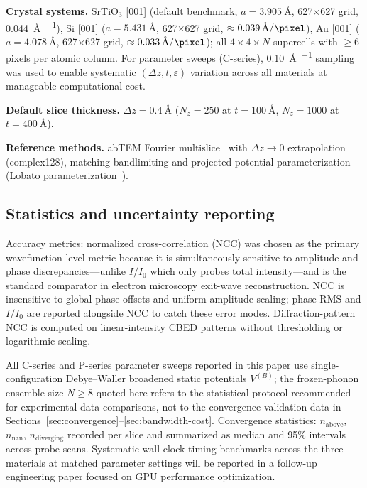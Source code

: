 \documentclass[twoside,11pt]{article}
\begin{document}
\textbf{Crystal systems.} SrTiO$_3$ [001] (default benchmark, $a=\SI{3.905}{\angstrom}$, 627$\times$627 grid, \SI{0.044}{\angstrom\per\pixel}), Si [001] ($a=\SI{5.431}{\angstrom}$, 627$\times$627 grid, $\approx\SI{0.039}{\angstrom\per\pixel}$), Au [001] ($a=\SI{4.078}{\angstrom}$, 627$\times$627 grid, $\approx\SI{0.033}{\angstrom\per\pixel}$); all $4\times4\times N$ supercells with $\ge6$ pixels per atomic column. For parameter sweeps (C-series), \SI{0.10}{\angstrom\per\pixel} sampling was used to enable systematic $(\Delta z, t, \varepsilon)$ variation across all materials at manageable computational cost.

\textbf{Default slice thickness.} $\Delta z=\SI{0.4}{\angstrom}$ ($N_z=250$ at $t=\SI{100}{\angstrom}$, $N_z=1000$ at $t=\SI{400}{\angstrom}$).

\textbf{Reference methods.} abTEM Fourier multislice~\cite{MadsenSusi2021} with $\Delta z\to0$ extrapolation (complex128), matching bandlimiting and projected potential parameterization (Lobato parameterization~\cite{LobatoVanDyck2014}).

\subsection{Statistics and uncertainty reporting}

Accuracy metrics: normalized cross-correlation (NCC) was chosen as the primary wavefunction-level metric because it is simultaneously sensitive to amplitude and phase discrepancies---unlike $I/I_0$ which only probes total intensity---and is the standard comparator in electron microscopy exit-wave reconstruction. NCC is insensitive to global phase offsets and uniform amplitude scaling; phase RMS and $I/I_0$ are reported alongside NCC to catch these error modes. Diffraction-pattern NCC is computed on linear-intensity CBED patterns without thresholding or logarithmic scaling.

All C-series and P-series parameter sweeps reported in this paper use single-configuration Debye--Waller broadened static potentials $V^{(B)}$; the frozen-phonon ensemble size $N\ge8$ quoted here refers to the statistical protocol recommended for experimental-data comparisons, not to the convergence-validation data in Sections~\ref{sec:convergence}--\ref{sec:bandwidth-cost}. Convergence statistics: $n_\text{above}$, $n_\text{nan}$, $n_\text{diverging}$ recorded per slice and summarized as median and 95\% intervals across probe scans. Systematic wall-clock timing benchmarks across the three materials at matched parameter settings will be reported in a follow-up engineering paper focused on GPU performance optimization.
\end{document}
